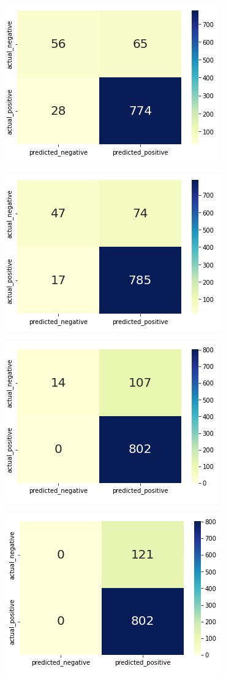 \documentclass{beamer}
\begin{document}
\begin{frame}
    \begin{figure}
        \includegraphics[width=.5\textwidth]{../figures/result_cm1.png}
    \end{figure}
    \begin{figure}
        \includegraphics[width=.5\textwidth]{../figures/result_cm2.png}
    \end{figure}
\end{frame}

\begin{frame}
    \begin{figure}
        \includegraphics[width=.5\textwidth]{../figures/result_cm5.png}
    \end{figure}
    \begin{figure}
        \includegraphics[width=.5\textwidth]{../figures/result_cm6.png}
    \end{figure}
\end{frame}
\end{document}
